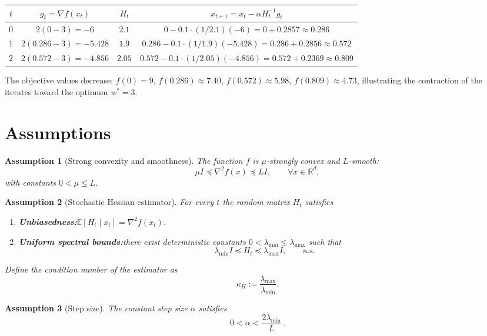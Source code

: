 \documentclass{article}
\newtheorem{assumption}{Assumption}
\newcommand{\E}{\mathbb{E}}
\newcommand{\R}{\mathbb{R}}
\begin{document}
\begin{center}
\begin{tabular}{c|c|c|c}
$t$ & $g_t=\nabla f(x_t)$ & $H_t$ & $x_{t+1}=x_t-\alpha H_t^{-1}g_t$ \\ \hline
0 & $2(0-3)=-6$ & $2.1$ & $0-0.1\cdot(1/2.1)(-6)=0+0.2857\approx0.286$ \\
1 & $2(0.286-3)=-5.428$ & $1.9$ & $0.286-0.1\cdot(1/1.9)(-5.428)=0.286+0.2856\approx0.572$ \\
2 & $2(0.572-3)=-4.856$ & $2.05$ & $0.572-0.1\cdot(1/2.05)(-4.856)=0.572+0.2369\approx0.809$\\
\end{tabular}
\end{center}
The objective values decrease:
$f(0)=9$, $f(0.286)\approx7.40$, $f(0.572)\approx5.98$, $f(0.809)\approx4.73$,
illustrating the contraction of the iterates toward the optimum $w^{*}=3$.

\newpage

\section*{Assumptions}
\begin{assumption}[Strong convexity and smoothness]
\label{as:strong}
The function $f$ is $\mu$‑strongly convex and $L$‑smooth:
\[
\mu I \preceq \nabla^{2}f(x) \preceq L I,\qquad \forall x\in\R^{d},
\]
with constants $0<\mu\le L$.
\end{assumption}

\begin{assumption}[Stochastic Hessian estimator]
\label{as:hessian}
For every $t$ the random matrix $H_t$ satisfies
\begin{enumerate}
\item \textbf{Unbiasedness:}\quad $\displaystyle \E[H_t\mid x_t]=\nabla^{2}f(x_t)$.
\item \textbf{Uniform spectral bounds:}\quad there exist deterministic
constants $0<\lambda_{\min}\le\lambda_{\max}$ such that
\[
\lambda_{\min} I \preceq H_t \preceq \lambda_{\max} I, \qquad\text{a.s.}
\tag{3}
\]
\end{enumerate}
Define the condition number of the estimator as
\[
\kappa_H:=\frac{\lambda_{\max}}{\lambda_{\min}} .
\]
\end{assumption}

\begin{assumption}[Step size]
\label{as:stepsize}
The constant step size $\alpha$ satisfies
\[
0<\alpha<\frac{2\lambda_{\min}}{L}\, .
\tag{4}
\]
\end{assumption}
\end{document}
